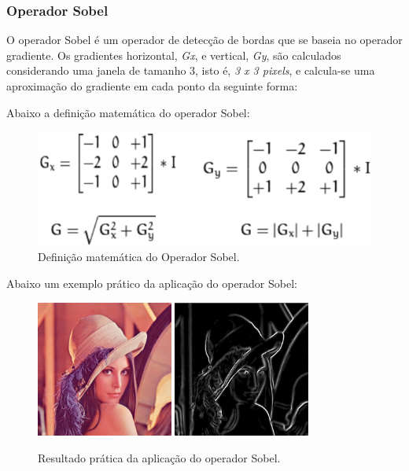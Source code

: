 \subsubsection{Operador Sobel}
O operador Sobel é um operador de detecção de bordas que se baseia no operador gradiente.
Os gradientes horizontal, \textit{Gx}, e vertical, \textit{Gy}, são calculados considerando uma janela de tamanho 3, isto é, \textit{3 x 3 pixels}, e calcula-se uma aproximação do gradiente em cada ponto da seguinte forma: \citep{sobel}

Abaixo a definição matemática do operador Sobel:
	\begin{figure}[!htb]
       \begin{center}  
          \includegraphics[width=0.7\columnwidth]{img/definicao_matematica_sobel.jpg}
           \caption{\label{fig:definicao_matematica_sobel}Definição matemática do Operador Sobel.}
       \end{center}
   \end{figure} 
   
Abaixo um exemplo prático da aplicação do operador Sobel:   
\begin{figure}[!htb]
 \centering
 \def\baselinestretch{1}\small\normalsize
 \includegraphics[width=0.4\textwidth]{img/lena_original.png}\qquad
 \includegraphics[width=0.4\textwidth]{img/lena_sobel.png} 
 \caption{\label{fig:lena_sobel}Resultado prática da aplicação do operador Sobel.}
\end{figure} 
\clearpage

